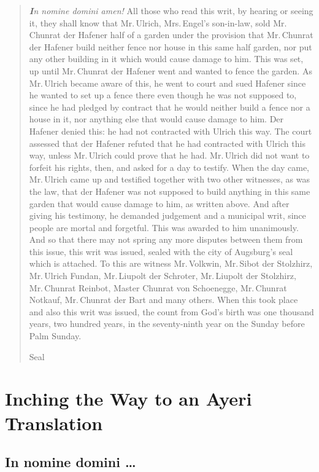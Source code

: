 \documentclass[12pt,paper=a4]{scrartcl}
\begin{document}
\begin{quotation}
\emph{\textbf{I}n nomine domini amen!} All those who read this writ, 
by hearing or seeing it, they shall know that Mr.\,Ulrich, Mrs.\,Engel's 
son-in-law, sold Mr.\,Chunrat der Hafener half of a garden under the provision 
that Mr.\,Chunrat der Hafener build neither fence nor house in this same half 
garden, nor put any other building in it which would cause damage to him. 
This was set, up until Mr.\,Chunrat der Hafener went and wanted to fence the 
garden. As Mr.\,Ulrich became aware of this, he went to court and sued Hafener 
since he wanted to set up a fence there even though he was not supposed to, 
since he had pledged by contract that he would neither build a fence nor a house 
in it, nor anything else that would cause damage to him. Der Hafener denied 
this: he had not contracted with Ulrich this way. The court assessed that der 
Hafener refuted that he had contracted with Ulrich this way, unless Mr.\,Ulrich 
could prove that he had. Mr.\,Ulrich did not want to forfeit his rights, then, 
and asked for a day to testify. When the day came, Mr.\,Ulrich came up and 
testified together with two other witnesses, as was the law, that der Hafener was 
not supposed to build anything in this same garden that would cause damage to 
him, as written above. And after giving his testimony, he demanded judgement and 
a municipal writ, since people are mortal and forgetful. This was awarded to him 
unanimously. And so that there may not spring any more disputes between them 
from this issue, this writ was issued, sealed with the city of Augsburg's seal 
which is attached. To this are witness Mr.\,Volkwin, Mr.\,Sibot der Stolzhirz, 
Mr.\,Ulrich Fundan, Mr.\,Liupolt der Schroter, Mr.\,Liupolt der Stolzhirz, 
Mr.\,Chunrat Reinbot, Master Chunrat von Schoenegge, Mr.\,Chunrat Notkauf, 
Mr.\,Chunrat der Bart and many others. When this took place and also this 
writ was issued, the count from God's birth was one thousand years, two hundred 
years, in the seventy-ninth year on the Sunday before Palm Sunday.

\begin{center}
Seal
\end{center}
\end{quotation}

\section{Inching the Way to an Ayeri Translation}

\subsection*{In nomine domini …}
\end{document}

